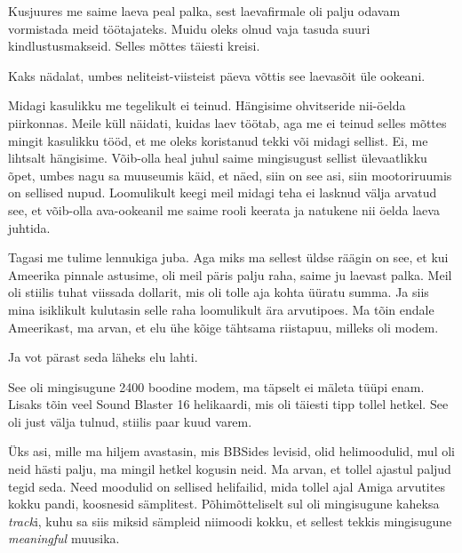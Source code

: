Kusjuures me saime laeva peal palka, sest laevafirmale oli palju odavam 
vormistada meid töötajateks. Muidu oleks olnud vaja tasuda suuri 
kindlustusmakseid. Selles mõttes täiesti kreisi.


Kaks nädalat, umbes neliteist-viisteist päeva võttis see laevasõit üle
ookeani.


Midagi kasulikku me tegelikult ei teinud. Hängisime ohvitseride nii-öelda 
piirkonnas. Meile küll näidati, kuidas laev töötab, aga me ei teinud selles 
mõttes mingit kasulikku tööd, et me oleks  koristanud tekki või midagi sellist. 
Ei, me lihtsalt hängisime. Võib-olla heal juhul saime mingisugust sellist  
ülevaatlikku õpet, umbes nagu sa muuseumis käid, et näed, siin on see asi, siin 
mootoriruumis on sellised nupud. Loomulikult keegi meil midagi teha ei lasknud 
välja arvatud see, et võib-olla ava-ookeanil me saime rooli keerata ja natukene 
nii öelda laeva juhtida.


Tagasi me tulime lennukiga juba. Aga miks ma sellest üldse räägin on see, et 
kui Ameerika pinnale astusime, oli meil päris palju raha, saime ju laevast 
palka. Meil oli stiilis tuhat viissada dollarit, mis oli tolle aja kohta üüratu 
summa. Ja siis mina isiklikult kulutasin selle raha loomulikult ära arvutipoes. 
Ma tõin endale Ameerikast, ma arvan, et elu ühe kõige tähtsama riistapuu, 
milleks oli modem. 

Ja vot pärast seda läheks elu lahti. 

See oli mingisugune 2400 boodine modem, ma täpselt ei mäleta tüüpi enam. Lisaks 
tõin veel Sound Blaster 16 helikaardi, mis oli täiesti 
tipp tollel hetkel. See oli just välja tulnud, 
stiilis paar kuud varem. 

Üks asi, mille ma  hiljem avastasin, mis BBSides levisid, olid  helimoodulid,  
mul oli neid hästi palju, ma mingil hetkel kogusin neid. Ma arvan, et tollel 
ajastul paljud tegid seda. Need moodulid on  sellised helifailid, mida tollel 
ajal Amiga arvutites kokku pandi, koosnesid sämplitest. Põhimõtteliselt sul oli 
 mingisugune kaheksa \emph{track}i, kuhu sa siis miksid sämpleid niimoodi 
kokku, et sellest tekkis mingisugune \emph{meaningful} muusika. 

